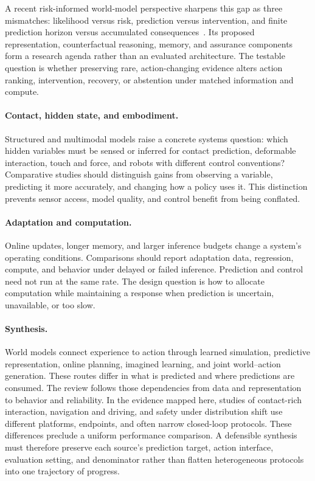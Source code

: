 A recent risk-informed world-model perspective sharpens this gap as three mismatches: likelihood versus risk, prediction versus intervention, and finite prediction horizon versus accumulated consequences~\cite{ma2026riskinformed}. Its proposed representation, counterfactual reasoning, memory, and assurance components form a research agenda rather than an evaluated architecture. The testable question is whether preserving rare, action-changing evidence alters action ranking, intervention, recovery, or abstention under matched information and compute.

\paragraph{Contact, hidden state, and embodiment.}
Structured and multimodal models raise a concrete systems question: which hidden variables must be sensed or inferred for contact prediction, deformable interaction, touch and force, and robots with different control conventions? Comparative studies should distinguish gains from observing a variable, predicting it more accurately, and changing how a policy uses it. This distinction prevents sensor access, model quality, and control benefit from being conflated.

\paragraph{Adaptation and computation.}
Online updates, longer memory, and larger inference budgets change a system's operating conditions. Comparisons should report adaptation data, regression, compute, and behavior under delayed or failed inference. Prediction and control need not run at the same rate. The design question is how to allocate computation while maintaining a response when prediction is uncertain, unavailable, or too slow.

\paragraph{Synthesis.}
World models connect experience to action through learned simulation, predictive representation, online planning, imagined learning, and joint world--action generation. These routes differ in what is predicted and where predictions are consumed. The review follows those dependencies from data and representation to behavior and reliability. In the evidence mapped here, studies of contact-rich interaction, navigation and driving, and safety under distribution shift use different platforms, endpoints, and often narrow closed-loop protocols. These differences preclude a uniform performance comparison. A defensible synthesis must therefore preserve each source's prediction target, action interface, evaluation setting, and denominator rather than flatten heterogeneous protocols into one trajectory of progress.
